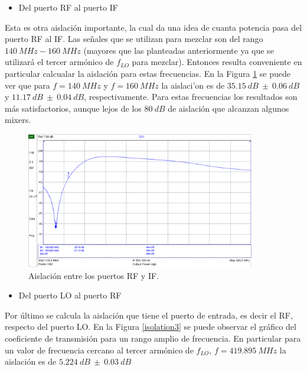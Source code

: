 \documentclass[a4paper,10pt]{article}
\begin{document}
	\begin{itemize}
		\item Del puerto RF al puerto IF
	\end{itemize}
	
	\indent Esta es otra aislaci\'on importante, la cual da una idea de cuanta 
	potencia pasa del puerto RF al IF. Las se\~nales que se utilizan para 
	mezclar son del rango $140~MHz-160~MHz$ (mayores que las planteadas 
	anteriormente ya que se utilizar\'a el tercer arm\'onico de 
	$f_{LO}$ para mezclar). Entonces resulta conveniente en particular calcualar
	la aislaci\'on para estas frecuencias. En la Figura \ref{isolation2} se 
	puede ver que para $f=140~MHz$ y $f=160~MHz$ la aislaci'on es de 
	$35.15~dB~\pm~0.06~dB$ y $11.17~dB~\pm~0.04~dB$, respectivamente. Para 
	estas frecuencias los resultados son m\'as satisfactorios, aunque lejos de 
	los $80~dB$ de aislaci\'on que alcanzan algunos mixers.
	
	\begin{figure}[!htb]
		\centering
		\includegraphics[width=10cm]{Images/aislacion2.png}
		\caption{Aislaci\'on entre los puertos RF y IF.}
		\label{isolation2}
	\end{figure}
	
	\begin{itemize}
		\item Del puerto LO al puerto RF
	\end{itemize}
	
	\indent Por \'ultimo se calcula la aislaci\'on que tiene el puerto de 
	entrada, es decir el RF, respecto del puerto LO. En la Figura 
	\ref{isolation3} se puede observar el gr\'afico del coeficiente de 
	transmisi\'on para un rango amplio de frecuencia. En particular para un 
	valor de frecuencia cercano al tercer arm\'onico de 
	$f_{LO}$, $f=419.895~MHz$ la aislaci\'on es de $5.224~dB~\pm~0.03~dB$
	
\end{document}
